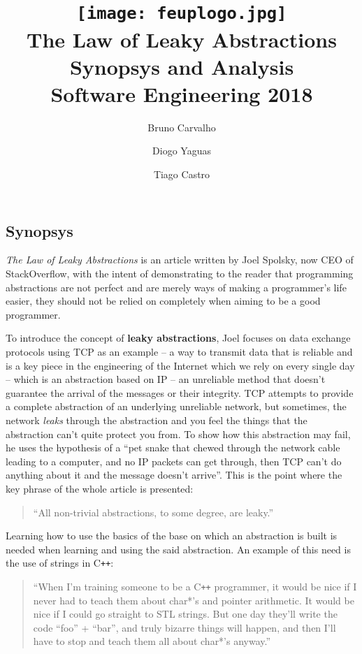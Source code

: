 \documentclass[12pt,a4paper,notitlepage]{article}
\title{
	\texttt{[image: feuplogo.jpg]}\\
	{\Huge The Law of Leaky Abstractions}\\
	{\Large Synopsys and Analysis}\\
	{\normalsize Software Engineering 2018}
}
\author{
	Bruno Carvalho\\ \text{up201606517}
	\and
	Diogo Yaguas\\ \text{up201606165}
	\and
	Tiago Castro\\ \text{up201606186}
}
\newcommand*{\cplusplus}{C\texttt{++}}
\begin{document}
\maketitle
\thispagestyle{empty}

\subsection{Synopsys}

\textit{The Law of Leaky Abstractions}
is an article written by Joel Spolsky, now CEO of StackOverflow, with the intent of demonstrating to the reader that programming abstractions are not perfect and are merely ways of making a programmer’s life easier, they should not be relied on completely when aiming to be a good programmer.

To introduce the concept of \textbf{leaky abstractions}, Joel focuses on data exchange protocols using TCP as an example -- a way to transmit data that is reliable and is a key piece in the engineering of the Internet which we rely on every single day -- which is an abstraction based on IP -- an unreliable method that doesn't guarantee the arrival of the messages or their integrity.
TCP attempts to provide a complete abstraction of an underlying unreliable network, but sometimes, the network \emph{leaks} through the abstraction and you feel the things that the abstraction can’t quite protect you from.
To show how this abstraction may fail, he uses the hypothesis of a “pet snake that chewed through the network cable leading to a computer, and no IP packets can get through, then TCP can’t do anything about it and the message doesn’t arrive”.
This is the point where the key phrase of the whole article is presented:

\begin{quote}
\large ``All non-trivial abstractions, to some degree, are leaky.''
\end{quote}

Learning how to use the basics of the base on which an abstraction is built is needed when learning and using the said abstraction.
An example of this need is the use of strings in \cplusplus{}:

\begin{quote}
``When I’m training someone to be a \cplusplus{} programmer, it would be nice if I never had to teach them about char*’s and pointer arithmetic.
It would be nice if I could go straight to STL strings.
But one day they’ll write the code “foo” + “bar”, and truly bizarre things will happen, and then I’ll have to stop and teach them all about char*’s anyway.''
\end{quote}
\end{document}
